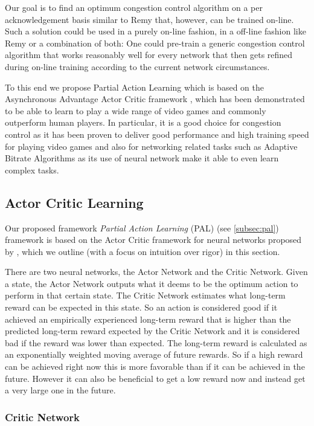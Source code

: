 \documentclass[newfonts=false,format=sigconf,10pt,letterpaper]{acmart}
\begin{document}
Our goal is to find an optimum congestion control algorithm on a per acknowledgement basis similar to Remy that, however, can be trained on-line.  Such a solution could be used in a purely on-line fashion, in a off-line fashion like Remy or a combination of both: One could pre-train a generic congestion control algorithm that works reasonably well for every network that then gets refined during on-line training according to the current network circumstances. 

To this end we propose Partial Action Learning which is based on the Asynchronous Advantage Actor Critic framework \cite{mnih_asynchronous_2016}, which has been demonstrated to be able to learn to play a wide range of video games and commonly outperform human players. In particular, it is a good choice for congestion control as it has been proven to deliver good performance and high training speed for playing video games and also for networking related tasks such as Adaptive Bitrate Algorithms \cite{mao_neural_2017} as its use of neural network make it able to even learn complex tasks.

\subsection{Actor Critic Learning}
\label{subsec:ac}

Our proposed framework \textit{Partial Action Learning} (PAL) (see \ref{subsec:pal}) framework is based on the Actor Critic framework for neural networks proposed by \citet{mnih_asynchronous_2016}, which we outline (with a focus on intuition over rigor) in this section. 

There are two neural networks, the Actor Network and the Critic Network. Given a state, the Actor Network outputs what it deems to be the optimum action to perform in that certain state. The Critic Network estimates what long-term reward can be expected in this state. So an action is considered good if it achieved an empirically experienced long-term reward that is higher than the predicted long-term reward expected by the Critic Network and it is considered bad if the reward was lower than expected. The long-term reward is calculated as an exponentially weighted moving average of future rewards. So if a high reward can be achieved right now this is more favorable than if it can be achieved in the future. However it can also be beneficial to get a low reward now and instead get a very large one in the future. 

\subsubsection{Critic Network}
\label{subsubsec:genericvalue}
\end{document}

